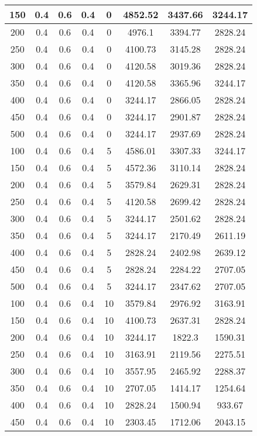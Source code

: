 \documentclass[a4paper, 12pt]{extreport}
\begin{document}
\begin{itemize}
\begin{longtable}{|c|c|c|c|c|c|c|c|}
			150 & 0.4 & 0.6 & 0.4 & 0 & 4852.52 & 3437.66 & 3244.17 \\\hline
			200 & 0.4 & 0.6 & 0.4 & 0 & 4976.1 & 3394.77 & 2828.24 \\\hline
			250 & 0.4 & 0.6 & 0.4 & 0 & 4100.73 & 3145.28 & 2828.24 \\\hline
			300 & 0.4 & 0.6 & 0.4 & 0 & 4120.58 & 3019.36 & 2828.24 \\\hline
			350 & 0.4 & 0.6 & 0.4 & 0 & 4120.58 & 3365.96 & 3244.17 \\\hline
			400 & 0.4 & 0.6 & 0.4 & 0 & 3244.17 & 2866.05 & 2828.24 \\\hline
			450 & 0.4 & 0.6 & 0.4 & 0 & 3244.17 & 2901.87 & 2828.24 \\\hline
			500 & 0.4 & 0.6 & 0.4 & 0 & 3244.17 & 2937.69 & 2828.24 \\\hline
			100 & 0.4 & 0.6 & 0.4 & 5 & 4586.01 & 3307.33 & 3244.17 \\\hline
			150 & 0.4 & 0.6 & 0.4 & 5 & 4572.36 & 3110.14 & 2828.24 \\\hline
			200 & 0.4 & 0.6 & 0.4 & 5 & 3579.84 & 2629.31 & 2828.24 \\\hline
			250 & 0.4 & 0.6 & 0.4 & 5 & 4120.58 & 2699.42 & 2828.24 \\\hline
			300 & 0.4 & 0.6 & 0.4 & 5 & 3244.17 & 2501.62 & 2828.24 \\\hline
			350 & 0.4 & 0.6 & 0.4 & 5 & 3244.17 & 2170.49 & 2611.19 \\\hline
			400 & 0.4 & 0.6 & 0.4 & 5 & 2828.24 & 2402.98 & 2639.12 \\\hline
			450 & 0.4 & 0.6 & 0.4 & 5 & 2828.24 & 2284.22 & 2707.05 \\\hline
			500 & 0.4 & 0.6 & 0.4 & 5 & 3244.17 & 2347.62 & 2707.05 \\\hline
			100 & 0.4 & 0.6 & 0.4 & 10 & 3579.84 & 2976.92 & 3163.91 \\\hline
			150 & 0.4 & 0.6 & 0.4 & 10 & 4100.73 & 2637.31 & 2828.24 \\\hline
			200 & 0.4 & 0.6 & 0.4 & 10 & 3244.17 & 1822.3 & 1590.31 \\\hline
			250 & 0.4 & 0.6 & 0.4 & 10 & 3163.91 & 2119.56 & 2275.51 \\\hline
			300 & 0.4 & 0.6 & 0.4 & 10 & 3557.95 & 2465.92 & 2288.37 \\\hline
			350 & 0.4 & 0.6 & 0.4 & 10 & 2707.05 & 1414.17 & 1254.64 \\\hline
			400 & 0.4 & 0.6 & 0.4 & 10 & 2828.24 & 1500.94 & 933.67 \\\hline
			450 & 0.4 & 0.6 & 0.4 & 10 & 2303.45 & 1712.06 & 2043.15 \\\hline

\end{longtable}
\end{itemize}
\end{document}
